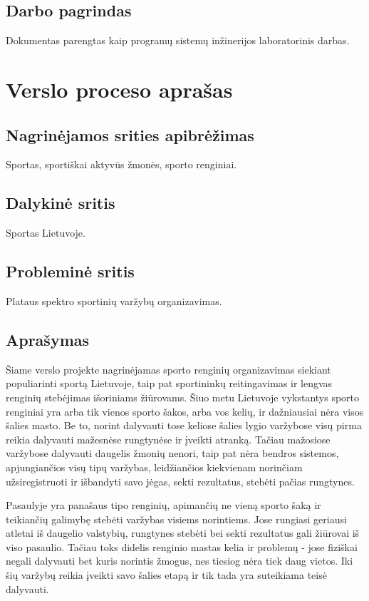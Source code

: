 \documentclass{VUMIFPSkursinis}
\begin{document}
  \subsection*{Darbo pagrindas}  \label{ivadas_darboPagrindas} %
    Dokumentas parengtas kaip programų sistemų inžinerijos laboratorinis darbas.

\section{Verslo proceso aprašas} \label{versloProcesoAprasas} %
  \subsection*{Nagrinėjamos srities apibrėžimas} \label{versloProcesoAprasas_sritiesApibrezimas}
    Sportas, sportiškai aktyvūs žmonės, sporto renginiai.
  \subsection*{Dalykinė sritis} \label{versloProcesoAprasas_dalykineSritis}
    Sportas Lietuvoje.
  \subsection*{Probleminė sritis} \label{versloProcesoAprasas_problemineSritis}
    Plataus spektro sportinių varžybų organizavimas.
  \subsection*{Aprašymas} \label{versloProcesoAprasas_aprasymas}
    Šiame verslo projekte nagrinėjamas sporto renginių organizavimas siekiant populiarinti sportą Lietuvoje,
    taip pat sportininkų reitingavimas ir lengvas renginių stebėjimas išoriniams žiūrovams. Šiuo metu Lietuvoje
    vykstantys sporto renginiai yra arba tik vienos sporto šakos, arba vos kelių, ir dažniausiai nėra visos
    šalies masto. Be to, norint dalyvauti tose keliose šalies lygio varžybose visų pirma reikia dalyvauti mažesnėse
    rungtynėse ir įveikti atranką. Tačiau mažosiose varžybose dalyvauti daugelis žmonių nenori, taip pat nėra bendros
    sistemos, apjungiančios visų tipų varžybas, leidžiančios kiekvienam norinčiam užsiregistruoti ir išbandyti savo jėgas,
    sekti rezultatus, stebėti pačias rungtynes.

    Pasaulyje yra panašaus tipo renginių, apimančių ne vieną sporto šaką ir teikiančių galimybę stebėti varžybas visiems
    norintiems. Jose rungiasi geriausi atletai iš daugelio valstybių, rungtynes stebėti bei sekti rezultatus gali žiūrovai
    iš viso pasaulio. Tačiau toks didelis renginio mastas kelia ir problemų - jose fiziškai negali dalyvauti bet kuris
    norintis žmogus, nes tiesiog nėra tiek daug vietos. Iki šių varžybų reikia įveikti savo šalies etapą ir tik tada yra
    suteikiama teisė dalyvauti.
\end{document}
